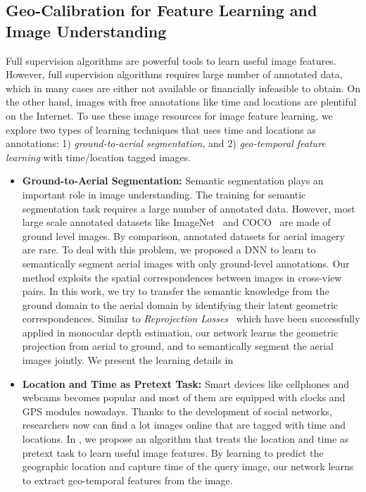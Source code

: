 \subsection{Geo-Calibration for Feature Learning and Image
Understanding}
Full supervision algorithms are powerful tools to learn useful image
features. However, full supervision algorithms requires large number
of annotated data, which in many cases are either not available or
financially infeasible to obtain. On the other hand, images with free
annotations like time and locations are plentiful on the Internet.
To use these image resources for image feature learning, 
we explore two types of learning techniques that uses time and
locations as annotations: 1) {\em ground-to-aerial segmentation}, and 2)
{\em geo-temporal feature learning} with time/location tagged images.
 
\begin{itemize}[noitemsep]
  \item \textbf{Ground-to-Aerial Segmentation:}
  Semantic segmentation plays an important role in image understanding.
  The training for semantic segmentation task requires a large number
  of annotated data.
  However, most large scale annotated datasets like ImageNet~\cite{ILSVRC15}
  and COCO~\cite{lin2014microsoft} are made of ground level images. By
  comparison, annotated datasets for aerial imagery are rare.
  To deal with this problem, we proposed a
  DNN to learn to semantically segment aerial images with only
  ground-level annotations. Our method exploits the spatial
  correspondences between images in cross-view pairs. 
  In this work, we try to transfer the semantic knowledge from the
  ground domain to the aerial domain by identifying their latent
  geometric correspondences. Similar to {\em
  Reprojection Losses}~\cite{garg2016unsupervised,
  godard2017unsupervised,zhou2017unsupervised, yan2016perspective}
  which have been successfully applied in monocular depth estimation,
  our network learns the geometric projection from aerial to ground, and
  to semantically segment the aerial images jointly.
  We present the learning details in 
  \newline

  \item \textbf{Location and Time as Pretext Task:}
  Smart devices like cellphones and webcams becomes popular and most
  of them are equipped with clocks and GPS modules nowadays. Thanks to
  the development of social networks, researchers now can find
  a lot images online that are tagged with time and locations. In
  , we propose an algorithm that treats the location and
  time as pretext task to learn useful image features.
  By learning to predict the geographic location and capture time of
  the query image, our network learns to extract geo-temporal features
  from the image.

\end{itemize}

